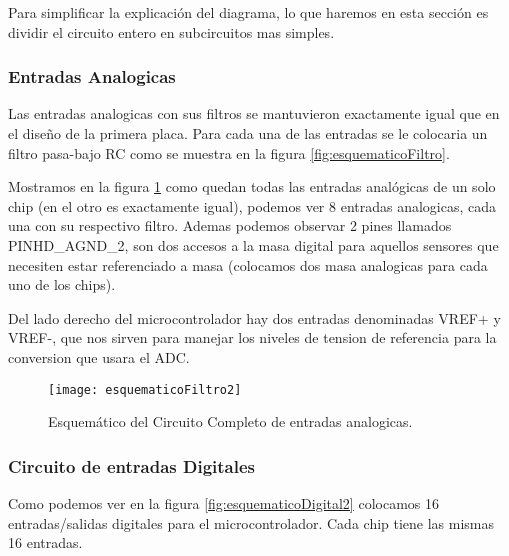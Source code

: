 Para simplificar la explicación del diagrama, lo que haremos en esta sección es dividir el circuito entero en subcircuitos mas simples.

\subsubsection{Entradas Analogicas}
\label{subsub: entradas_analogicas2}

Las entradas analogicas con sus filtros se mantuvieron exactamente igual que en el diseño de la primera placa. Para cada una de las entradas se le colocaria un filtro pasa-bajo RC como se muestra en la figura \ref{fig:esquematicoFiltro}.

Mostramos en la figura \ref{fig:esquematicoFiltro2} como quedan todas las entradas analógicas de un solo chip (en el otro es exactamente igual), podemos ver 8 entradas analogicas, cada una con su respectivo filtro. Ademas podemos observar 2 pines llamados PINHD_AGND_2, son dos accesos a la masa digital para aquellos sensores que necesiten estar referenciado a masa (colocamos dos masa analogicas para cada uno de los chips).

Del lado derecho del microcontrolador hay dos entradas denominadas VREF+ y VREF-, que nos sirven para manejar los niveles de tension de referencia para la conversion que usara el ADC.

\begin{figure}
\centering
  \texttt{[image: esquematicoFiltro2]}
  \caption{Esquemático del Circuito Completo de entradas analogicas.}\label{fig:esquematicoFiltro2}
\end{figure}


\subsubsection{Circuito de entradas Digitales}
\label{subsub:entradas_digitales}

Como podemos ver en la figura \ref{fig:esquematicoDigital2} colocamos 16 entradas/salidas digitales para el microcontrolador. Cada chip tiene las mismas 16 entradas.

